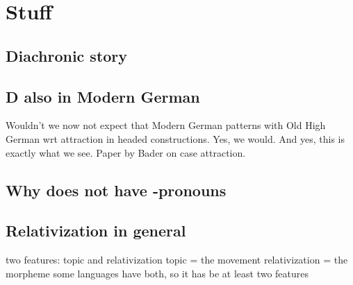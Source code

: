 
\chapter{Stuff}

\section{Diachronic story}

\section{D also in Modern German}

Wouldn't we now not expect that Modern German patterns with Old High German wrt attraction in headed constructions. Yes, we would. And yes, this is exactly what we see. Paper by Bader on case attraction.

\section{Why  does not have -pronouns}

\section{Relativization in general}

two features: topic and relativization
topic = the movement
relativization = the morpheme
some languages have both, so it has be at least two features
